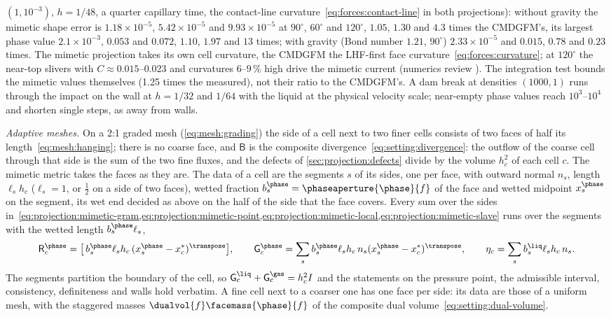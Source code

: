 $(1,10^{-3})$, $h=1/48$, a quarter capillary time, the contact-line
curvature~\cref{eq:forces:contact-line} in both projections): without gravity
the mimetic shape error is $1.18\times10^{-5}$, $5.42\times10^{-5}$ and
$9.93\times10^{-5}$ at $90^\circ$, $60^\circ$ and $120^\circ$, $1.05$, $1.30$
and $4.3$ times the CMDGFM's, its largest phase value $2.1\times10^{-3}$,
$0.053$ and $0.072$, $1.10$, $1.97$ and $13$ times; with gravity (Bond number
$1.21$, $90^\circ$) $2.33\times10^{-5}$ and $0.015$, $0.78$ and $0.23$ times.
The mimetic projection takes its own cell curvature, the CMDGFM the LHF-first
face curvature~\cref{eq:forces:curvature}; at $120^\circ$ the near-top
slivers with $C\approx0.015$--$0.023$ and curvatures $6$--$9\,\%$ high drive
the mimetic current (numerics review ). The
integration test bounds the mimetic values themselves (1.25 times the
measured), not their ratio to the CMDGFM's. A dam break
at densities $(1000,1)$ runs through the impact on the wall at $h=1/32$ and
$1/64$ with the liquid at the physical velocity scale; near-empty phase values
reach $10^3$--$10^4$ and shorten single steps, as away from walls.

\emph{Adaptive meshes.} On a 2:1 graded mesh (\cref{eq:mesh:grading}) the
side of a cell next to two finer cells consists of two faces of half its
length~\cref{eq:mesh:hanging}; there is no coarse face, and $\mathsf B$ is the
composite divergence~\cref{eq:setting:divergence}: the outflow of the coarse
cell through that side is the sum of the two fine fluxes, and the defects of
\cref{sec:projection:defects} divide by the volume $h_c^2$ of each cell $c$.
The mimetic metric takes the faces as they are. The data of a cell are the
segments $s$ of its sides, one per face, with outward normal $n_s$, length
$\ell_sh_c$ ($\ell_s=1$, or $\frac12$ on a side of two faces), wetted
fraction $b^{\phase}_s=\phaseaperture{\phase}{f}$ of the face and wetted
midpoint $x^{\phase}_s$ on the segment, its wet end decided as above on the
half of the side that the face covers. Every sum over the sides
in~\cref{eq:projection:mimetic-gram,eq:projection:mimetic-point,eq:projection:mimetic-local,eq:projection:mimetic-slave}
runs over the segments with the wetted length $b^{\phase}_s\ell_s$,
\begin{equation}\label{eq:projection:mimetic-segments}
  \mathsf R^{\phase}_c=\bigl[\,b^{\phase}_s\ell_sh_c\,(x^{\phase}_s-x^{*}_c)^{\transpose}\bigr],\qquad
  \mathsf G^{\phase}_c=\sum_sb^{\phase}_s\ell_sh_c\,n_s(x^{\phase}_s-x^{*}_c)^{\transpose},\qquad
  \eta_c=\sum_sb^{\liq}_s\ell_sh_c\,n_s .
\end{equation}
The segments partition the boundary of the cell, so
$\mathsf G^{\liq}_c+\mathsf G^{\gas}_c=h_c^2I$ and the statements on the pressure
point, the admissible interval, consistency, definiteness and walls hold
verbatim. A fine cell next to a coarser one has one face per side: its data
are those of a uniform mesh, with the staggered masses
$\dualvol{f}\facemass{\phase}{f}$ of the composite dual volume~\cref{eq:setting:dual-volume}.

